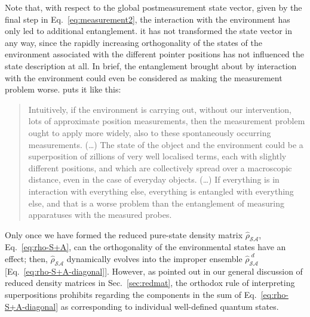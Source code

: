 \documentclass[rmp,aps,amsmath,amsfonts,noshowkeys,noshowpacs,12pt]{revtex4}
\begin{document}
Note that, with respect to the global postmeasurement state vector,
given by the final step in Eq.~\eqref{eq:measurement2}, the
interaction with the environment has only led to additional
entanglement. it has not transformed the state vector in any way,
since the rapidly increasing orthogonality of the states of the
environment associated with the different pointer positions has not
influenced the state description at all. In brief, the entanglement
brought about by interaction with the environment could even be
considered as making the measurement problem worse.
\citet[Sec.~3.2]{Bacciagaluppi:2003:yz} puts it like this:
%
\begin{quote} {\small 
    Intuitively, if the environment is carrying out, without our
    intervention, lots of approximate position measurements, then the
    measurement problem ought to apply more widely, also to these
    spontaneously occurring measurements. (\dots) The state of the
    object and the environment could be a superposition of zillions of
    very well localised terms, each with slightly different positions,
    and which are collectively spread over a macroscopic distance,
    even in the case of everyday objects.  (\dots) If everything is in
    interaction with everything else, everything is entangled with
    everything else, and that is a worse problem than the entanglement
    of measuring apparatuses with the measured probes.
}\end{quote}
%
Only once we have formed the reduced pure-state density matrix
$\widehat{\rho}_\mathcal{SA}$, Eq.~\eqref{eq:rho-S+A}, can the
orthogonality of the environmental states have an effect; then,
$\widehat{\rho}_\mathcal{SA}$ dynamically evolves into the improper
ensemble $\widehat{\rho}_\mathcal{SA}^{\,\,d}$
[Eq.~\eqref{eq:rho-S+A-diagonal}]. However, as pointed out in our
general discussion of reduced density matrices in
Sec.~\ref{sec:redmat}, the orthodox rule of interpreting
superpositions prohibits regarding the components in the sum of
Eq.~\eqref{eq:rho-S+A-diagonal} as corresponding to individual
well-defined quantum states.
\end{document}
